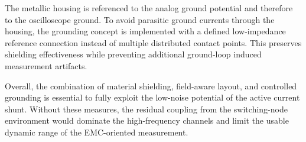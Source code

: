 The metallic housing is referenced to the analog ground potential and therefore to the oscilloscope ground.
To avoid parasitic ground currents through the housing, the grounding concept is implemented with a defined low-impedance reference connection instead of multiple distributed contact points.
This preserves shielding effectiveness while preventing additional ground-loop induced measurement artifacts.

Overall, the combination of material shielding, field-aware layout, and controlled grounding is essential to fully exploit the low-noise potential of the active current shunt.
Without these measures, the residual coupling from the switching-node environment would dominate the high-frequency channels and limit the usable dynamic range of the EMC-oriented measurement.